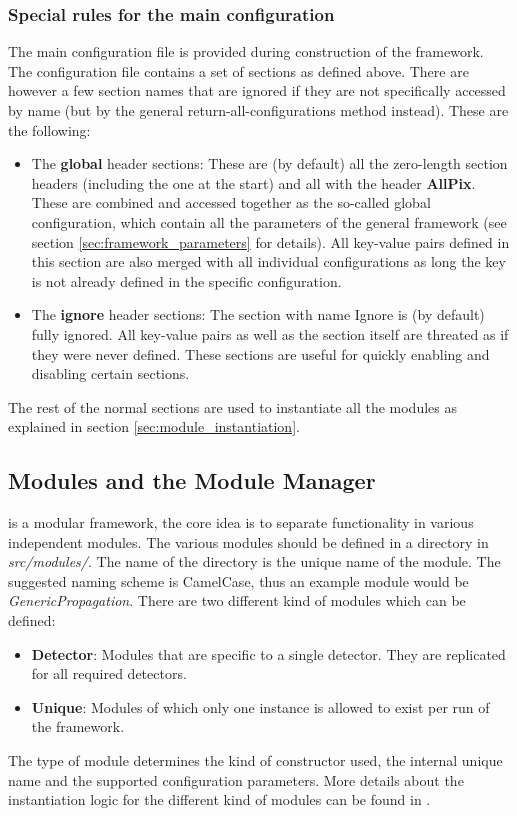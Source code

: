 \subsubsection{Special rules for the main configuration}
The main configuration file is provided during construction of the framework. The configuration file contains a set of sections as defined above. There are however a few section names that are ignored if they are not specifically accessed by name (but by the general return-all-configurations method instead). These are the following:
\begin{itemize}
\item The \textbf{global} header sections: These are (by default) all the zero-length section headers (including the one at the start) and all with the header \textbf{AllPix}. These are combined and accessed together as the so-called global configuration, which contain all the parameters of the general framework (see section \ref{sec:framework_parameters} for details). All key-value pairs defined in this section are also merged with all individual configurations as long the key is not already defined in the specific configuration.
\item The \textbf{ignore} header sections: The section with name Ignore is (by default) fully ignored. All key-value pairs as well as the section itself are threated as if they were never defined. These sections are useful for quickly enabling and disabling certain sections.
\end{itemize}

The rest of the normal sections are used to instantiate all the modules as explained in section \ref{sec:module_instantiation}.

\subsection{Modules and the Module Manager}
\label{sec:module_manager}
\apsq is a modular framework, the core idea is to separate functionality in various independent modules. The various modules should be defined in a directory in \textit{src/modules/}. The name of the directory is the unique name of the module. The suggested naming scheme is CamelCase, thus an example module would be \textit{GenericPropagation}. There are two different kind of modules which can be defined:
\begin{itemize}
\item \textbf{Detector}: Modules that are specific to a single detector. They are replicated for all required detectors.
\item \textbf{Unique}: Modules of which only one instance is allowed to exist per run of the framework.
\end{itemize}
The type of module determines the kind of constructor used, the internal unique name and the supported configuration parameters. More details about the instantiation logic for the different kind of modules can be found in \needref.

